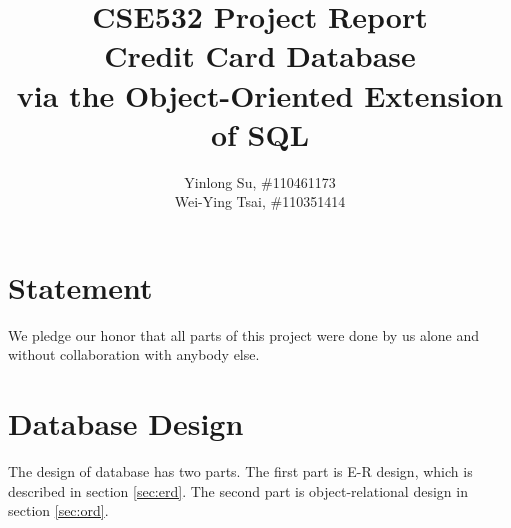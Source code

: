 \documentclass[11pt]{article}
\begin{document}
\title{CSE532 Project Report\\\large Credit Card Database\\via the Object-Oriented Extension of SQL}
\author{Yinlong Su, \#110461173 \\ Wei-Ying Tsai, \#110351414}
\maketitle

\setcounter{section}{-1}
\section{Statement}
We pledge our honor that all parts of this project were done by us alone and without collaboration with anybody else.

\section{Database Design}
The design of database has two parts. The first part is E-R design, which is described in section \ref{sec:erd}. The second part is object-relational design in section \ref{sec:ord}.
\end{document}

